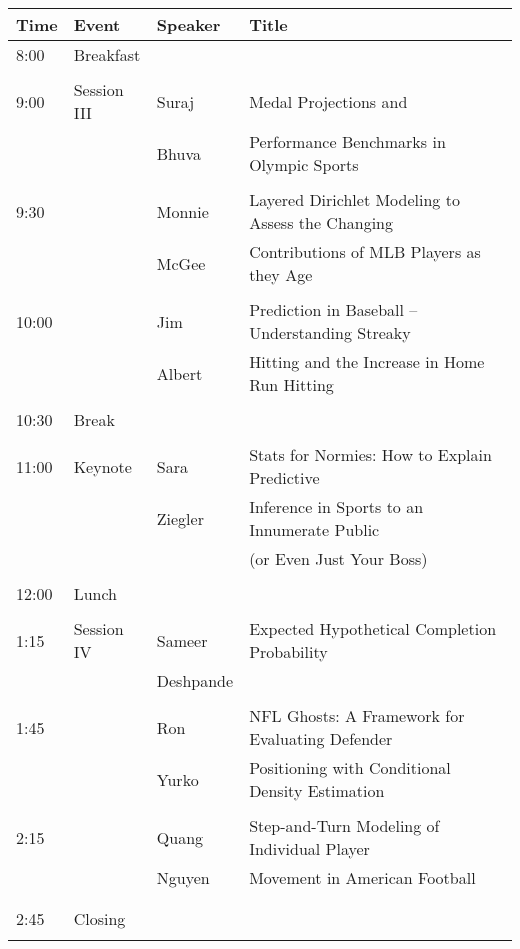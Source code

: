 \documentclass[12pt]{article}
\begin{document}
\begin{tabular}{l|l|l|l}
Time & Event & Speaker & Title \\
\hline
8:00 & \multicolumn{3}{|l}{Breakfast} \\
\hline
& & & \\
9:00 & Session III 
& Suraj  & Medal Projections and \\
& & Bhuva & Performance Benchmarks in Olympic Sports \\
& & & \\
9:30 &  & Monnie 
& Layered Dirichlet Modeling to Assess the Changing \\
& & McGee & Contributions of MLB Players as they Age \\
& & & \\
10:00 &  & Jim 
& Prediction in Baseball -- Understanding Streaky \\
& & Albert & Hitting and the Increase in Home Run Hitting \\
& & & \\
\hline
10:30 & \multicolumn{3}{|l}{Break} \\
\hline
& & & \\
11:00 & Keynote & Sara 
& Stats for Normies: How to Explain Predictive \\
& & Ziegler & Inference in Sports to an Innumerate Public \\
& & & (or Even Just Your Boss) \\
& & & \\
\hline
12:00 & \multicolumn{3}{|l}{Lunch} \\
\hline
& & & \\
1:15 & Session IV & Sameer 
& Expected Hypothetical Completion Probability \\
& & Deshpande & \\
& & & \\
1:45 &  & Ron 
& NFL Ghosts: A Framework for Evaluating Defender \\
& & Yurko & Positioning with Conditional Density Estimation \\
& & & \\
2:15 &  & Quang 
& Step-and-Turn Modeling of Individual Player \\
& & Nguyen & Movement in American Football \\
& & & \\
\hline
& \multicolumn{3}{|l}{}\\
2:45 & \multicolumn{3}{|l}{Closing} \\
& \multicolumn{3}{|l}{}\\
\hline
\end{tabular}
\end{document}
